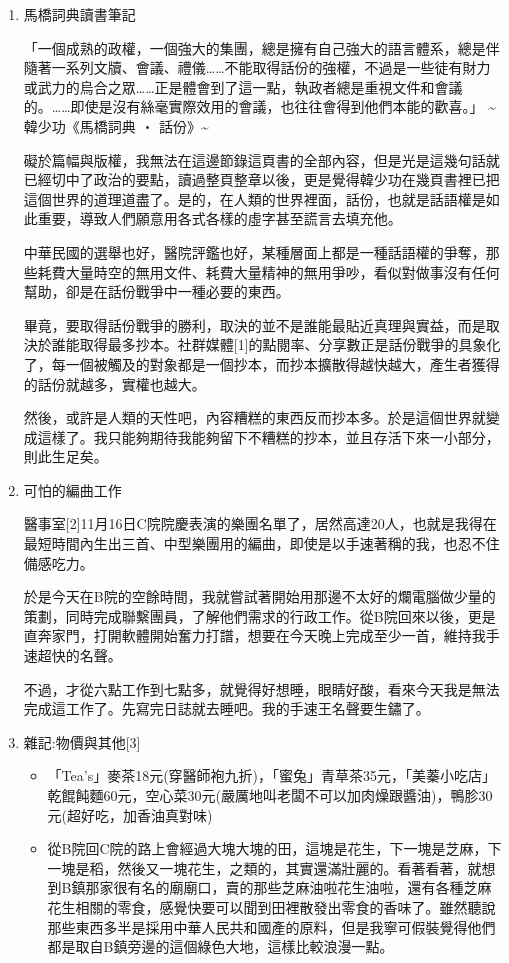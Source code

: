 \documentclass[a5paper, 12pt
]{book}
\providecommand{\tightlist}{%
  \setlength{\itemsep}{0pt}\setlength{\parskip}{0pt}}
\begin{document}
\begin{enumerate}
\def\labelenumi{\arabic{enumi}.}
\item
  馬橋詞典讀書筆記

  「一個成熟的政權，一個強大的集團，總是擁有自己強大的語言體系，總是伴隨著一系列文牘、會議、禮儀\ldots\ldots 不能取得話份的強權，不過是一些徒有財力或武力的烏合之眾\ldots\ldots 正是體會到了這一點，執政者總是重視文件和會議的。\ldots\ldots 即使是沒有絲毫實際效用的會議，也往往會得到他們本能的歡喜。」
  \textasciitilde{} 韓少功《馬橋詞典 ‧ 話份》\textasciitilde{}

  礙於篇幅與版權，我無法在這邊節錄這頁書的全部內容，但是光是這幾句話就已經切中了政治的要點，讀過整頁整章以後，更是覺得韓少功在幾頁書裡已把這個世界的道理道盡了。是的，在人類的世界裡面，話份，也就是話語權是如此重要，導致人們願意用各式各樣的虛字甚至謊言去填充他。

  中華民國的選舉也好，醫院評鑑也好，某種層面上都是一種話語權的爭奪，那些耗費大量時空的無用文件、耗費大量精神的無用爭吵，看似對做事沒有任何幫助，卻是在話份戰爭中一種必要的東西。

  畢竟，要取得話份戰爭的勝利，取決的並不是誰能最貼近真理與實益，而是取決於誰能取得最多抄本。社群媒體{[}1{]}的點閱率、分享數正是話份戰爭的具象化了，每一個被觸及的對象都是一個抄本，而抄本擴散得越快越大，產生者獲得的話份就越多，實權也越大。

  然後，或許是人類的天性吧，內容糟糕的東西反而抄本多。於是這個世界就變成這樣了。我只能夠期待我能夠留下不糟糕的抄本，並且存活下來一小部分，則此生足矣。
\item
  可怕的編曲工作

  醫事室{[}2{]}11月16日C院院慶表演的樂團名單了，居然高達20人，也就是我得在最短時間內生出三首、中型樂團用的編曲，即使是以手速著稱的我，也忍不住備感吃力。

  於是今天在B院的空餘時間，我就嘗試著開始用那邊不太好的爛電腦做少量的策劃，同時完成聯繫團員，了解他們需求的行政工作。從B院回來以後，更是直奔家門，打開軟體開始奮力打譜，想要在今天晚上完成至少一首，維持我手速超快的名聲。

  不過，才從六點工作到七點多，就覺得好想睡，眼睛好酸，看來今天我是無法完成這工作了。先寫完日誌就去睡吧。我的手速王名聲要生鏽了。
\item
  雜記:物價與其他{[}3{]}

  \begin{itemize}
  \tightlist
  \item
    「Tea's」麥茶18元(穿醫師袍九折)，「蜜兔」青草茶35元，「美蓁小吃店」乾餛飩麵60元，空心菜30元(嚴厲地叫老闆不可以加肉燥跟醬油)，鴨胗30元(超好吃，加香油真對味)
  \item
    從B院回C院的路上會經過大塊大塊的田，這塊是花生，下一塊是芝麻，下一塊是稻，然後又一塊花生，之類的，其實還滿壯麗的。看著看著，就想到B鎮那家很有名的廟廟口，賣的那些芝麻油啦花生油啦，還有各種芝麻花生相關的零食，感覺快要可以聞到田裡散發出零食的香味了。雖然聽說那些東西多半是採用中華人民共和國產的原料，但是我寧可假裝覺得他們都是取自B鎮旁邊的這個綠色大地，這樣比較浪漫一點。
  \end{itemize}
\end{enumerate}
\end{document}
